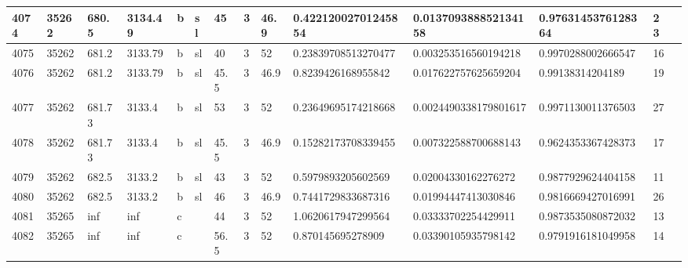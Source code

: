 \documentclass[11pt,a4paper]{article}
\begin{document}
\begin{table}[h]
\begin{tabular}{|l|l|l|l|l|l|l|l|l|l|l|l|l|l|}
4074 & 35262 & 680.5 & 3134.49 & b & sl & 45 & 3 & 46.9 & 0.42212002701245854 & 0.013709388852134158 & 0.9763145376128364 & 23 &  \\ \hline
4075 & 35262 & 681.2 & 3133.79 & b & sl & 40 & 3 & 52 & 0.23839708513270477 & 0.003253516560194218 & 0.9970288002666547 & 16 &  \\ \hline
4076 & 35262 & 681.2 & 3133.79 & b & sl & 45.5 & 3 & 46.9 & 0.8239426168955842 & 0.017622757625659204 & 0.99138314204189 & 19 &  \\ \hline
4077 & 35262 & 681.73 & 3133.4 & b & sl & 53 & 3 & 52 & 0.23649695174218668 & 0.0024490338179801617 & 0.9971130011376503 & 27 &  \\ \hline
4078 & 35262 & 681.73 & 3133.4 & b & sl & 45.5 & 3 & 46.9 & 0.15282173708339455 & 0.007322588700688143 & 0.9624353367428373 & 17 &  \\ \hline
4079 & 35262 & 682.5 & 3133.2 & b & sl & 43 & 3 & 52 & 0.5979893205602569 & 0.02004330162276272 & 0.9877929624404158 & 11 &  \\ \hline
4080 & 35262 & 682.5 & 3133.2 & b & sl & 46 & 3 & 46.9 & 0.7441729833687316 & 0.01994447413030846 & 0.9816669427016991 & 26 &  \\ \hline
4081 & 35265 & inf & inf & c &  & 44 & 3 & 52 & 1.0620617947299564 & 0.03333702254429911 & 0.9873535080872032 & 13 &  \\ \hline
4082 & 35265 & inf & inf & c &  & 56.5 & 3 & 52 & 0.870145695278909 & 0.03390105935798142 & 0.9791916181049958 & 14 &  \\ \hline
\end{tabular}
\end{table}
\end{document}

